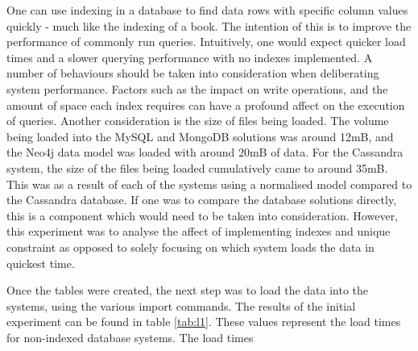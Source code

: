 One can use indexing in a database to find data rows with specific column values quickly - much like the indexing of a book. The intention of this is to improve the performance of commonly run queries. Intuitively, one would expect quicker load times and a slower querying performance with no indexes implemented. A number of behaviours should be taken into consideration when deliberating system performance. Factors such as the impact on write operations, and the amount of space each index requires can have a profound affect on the execution of queries. Another consideration is the size of files being loaded. The volume being loaded into the MySQL and MongoDB solutions was around 12mB, and the Neo4j data model was loaded with around 20mB of data. For the Cassandra system, the size of the files being loaded cumulatively came to around 35mB. This was as a result of each of the systems using a normalised model compared to the Cassandra database. If one was to compare the database solutions directly, this is a component which would need to be taken into consideration. However, this experiment was to analyse the affect of implementing indexes and unique constraint as opposed to solely focusing on which system loads the data in quickest time.

Once the tables were created, the next step was to load the data into the systems, using the various import commands. The results of the initial experiment can be found in table \ref{tab:l1}. These values represent the load times for non-indexed database systems. The load times 

